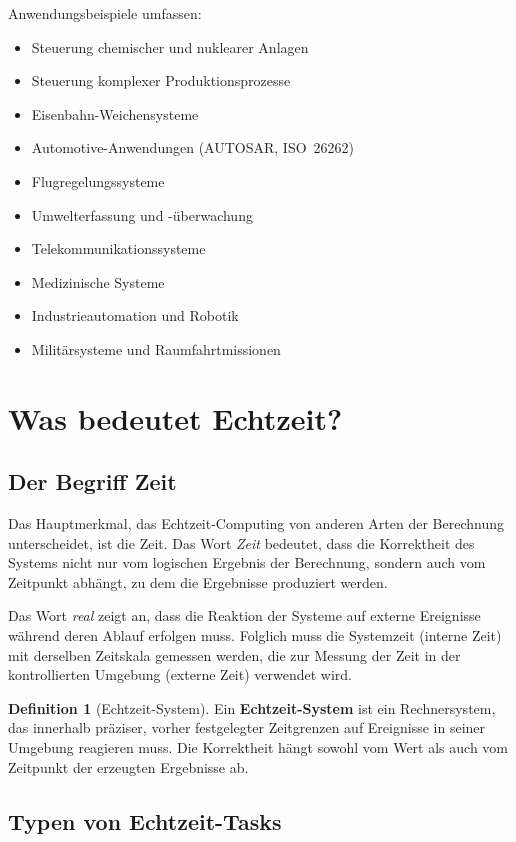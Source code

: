 ﻿\documentclass[a4paper,12pt]{report}
\theoremstyle{definition}
\newtheorem{definition}{Definition}[chapter]
\begin{document}
Anwendungsbeispiele umfassen:
\begin{itemize}
	\item Steuerung chemischer und nuklearer Anlagen
	\item Steuerung komplexer Produktionsprozesse
	\item Eisenbahn-Weichensysteme
	\item Automotive-Anwendungen (AUTOSAR, ISO~26262)
	\item Flugregelungssysteme
	\item Umwelterfassung und -überwachung
	\item Telekommunikationssysteme
	\item Medizinische Systeme
	\item Industrieautomation und Robotik
	\item Militärsysteme und Raumfahrtmissionen
\end{itemize}

\section{Was bedeutet Echtzeit?}

\subsection{Der Begriff Zeit}

Das Hauptmerkmal, das Echtzeit-Computing von anderen Arten der Berechnung unterscheidet,
ist die Zeit. Das Wort \emph{Zeit} bedeutet, dass die Korrektheit des Systems nicht nur
vom logischen Ergebnis der Berechnung, sondern auch vom Zeitpunkt abhängt, zu dem
die Ergebnisse produziert werden.

Das Wort \emph{real} zeigt an, dass die Reaktion der Systeme auf externe Ereignisse
während deren Ablauf erfolgen muss. Folglich muss die Systemzeit (interne Zeit) mit
derselben Zeitskala gemessen werden, die zur Messung der Zeit in der kontrollierten
Umgebung (externe Zeit) verwendet wird.

\begin{definition}[Echtzeit-System]
	Ein \textbf{Echtzeit-System} ist ein Rechnersystem, das innerhalb präziser,
	vorher festgelegter Zeitgrenzen auf Ereignisse in seiner Umgebung reagieren muss.
	Die Korrektheit hängt sowohl vom Wert als auch vom Zeitpunkt der erzeugten
	Ergebnisse ab.
\end{definition}

\subsection{Typen von Echtzeit-Tasks}
\end{document}
